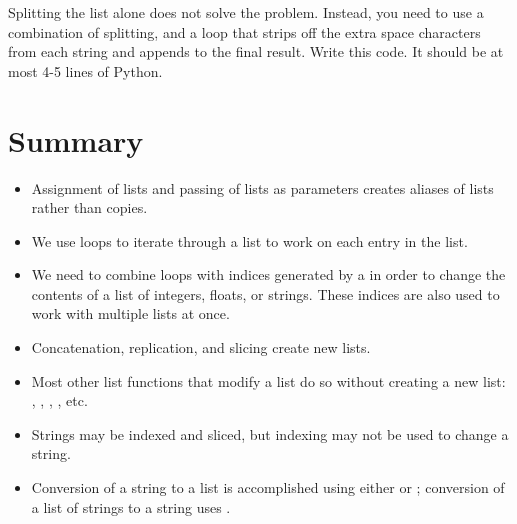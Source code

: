 \documentclass[letterpaper,10pt,english]{sphinxmanual}
\begin{document}
\begin{enumerate}
Splitting the list alone does not solve the problem. Instead, you
need to use a combination of splitting, and a loop that strips off
the extra space characters from each string and appends to the final
result. Write this code. It should be at most 4-5 lines of Python.

\end{enumerate}


\section{Summary}
\label{\detokenize{lecture_notes/lec10_lists2:summary}}\begin{itemize}
\item {} 
Assignment of lists and passing of lists as parameters creates
aliases of lists rather than copies.

\item {} 
We use  loops to iterate through a list to work on each entry
in the list.

\item {} 
We need to combine  loops with indices generated by a
 in order to change the contents of a list of integers,
floats, or strings. These indices are also used to work with
multiple lists at once.

\item {} 
Concatenation, replication, and slicing create new lists.

\item {} 
Most other list functions that modify a list do so without creating a
new list: , , , , etc.

\item {} 
Strings may be indexed and sliced, but indexing may not be used to
change a string.

\item {} 
Conversion of a string to a list is accomplished using either
 or ; conversion of a list of strings to a string
uses .

\end{itemize}
\end{document}
